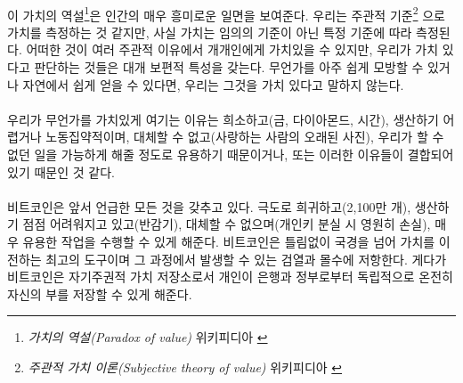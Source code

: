 \paragraph{}
이 가치의 역설\footnote{\textit{가치의 역설(Paradox of value)} 위키피디아 \cite{wiki:paradox-of-value}}은 
인간의 매우 흥미로운 일면을 보여준다. 
우리는 주관적 기준\footnote{\textit{주관적 가치 이론(Subjective theory of value)} 위키피디아 \cite{wiki:subjective-theory-of-value}}
으로 가치를 측정하는 것 같지만, 사실 가치는 임의의 기준이 아닌 특정 기준에 따라 측정된다. 
어떠한 것이 여러 주관적 이유에서 개개인에게 가치있을 수 있지만, 우리가 가치 있다고 판단하는 것들은 대개 보편적 특성을 갖는다.
무언가를 아주 쉽게 모방할 수 있거나 자연에서 쉽게 얻을 수 있다면, 우리는 그것을 가치 있다고 말하지 않는다. 


% 
\paragraph{}
우리가 무언가를 가치있게 여기는 이유는 
희소하고(금, 다이아몬드, 시간),
생산하기 어렵거나 노동집약적이며, 대체할 수 없고(사랑하는 사람의 오래된 사진),
우리가 할 수 없던 일을 가능하게 해줄 정도로 유용하기 때문이거나, 
또는 이러한 이유들이 결합되어 있기 때문인 것 같다.


\paragraph{}
비트코인은 앞서 언급한 모든 것을 갖추고 있다. 극도로 희귀하고(2,100만 개),
생산하기 점점 어려워지고 있고(반감기), 대체할 수 없으며(개인키 분실 시 영원히 손실),
매우 유용한 작업을 수행할 수 있게 해준다. 비트코인은 틀림없이 국경을 넘어 가치를 이전하는 최고의 도구이며 
그 과정에서 발생할 수 있는 검열과 몰수에 저항한다. 게다가 비트코인은 자기주권적 가치 저장소로서
개인이 은행과 정부로부터 독립적으로 온전히 자신의 부를 저장할 수 있게 해준다.

